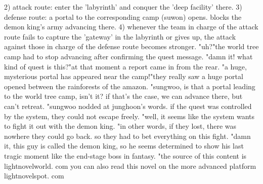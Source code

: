2) attack route: enter the 'labyrinth' and conquer the 'deep facility' there.
3) defense route: a portal to the corresponding camp (suwon) opens.
 blocks the demon king's army advancing there.
4) whenever the team in charge of the attack route fails to capture the 'gateway' in the labyrinth or gives up, the attack against those in charge of the defense route becomes stronger.
"uh?"the world tree camp had to stop advancing after confirming the quest message.
 "damn it! what kind of quest is this?"at that moment a report came in from the rear.
"a huge, mysterious portal has appeared near the camp!"they really saw a huge portal opened between the rainforests of the amazon.
"sungwoo, is that a portal leading to the world tree camp, isn't it? if that's the case, we can advance there, but can't retreat.
"sungwoo nodded at junghoon's words.
 if the quest was controlled by the system, they could not escape freely.
 "well, it seems like the system wants to fight it out with the demon king.
"in other words, if they lost, there was nowhere they could go back.
 so they had to bet everything on this fight.
 "damn it, this guy is called the demon king, so he seems determined to show his last tragic moment like the end-stage boss in fantasy.
"the source of this content is lightnov­elworld.
com you can also read this novel on the more advanced platform lightnovelspot.
com

 